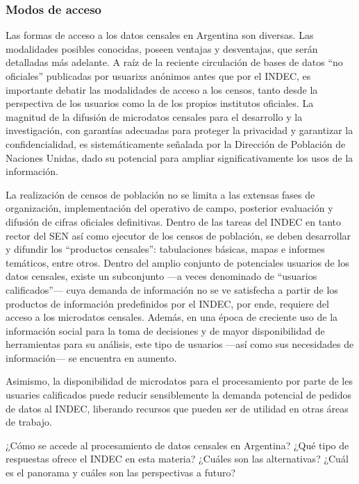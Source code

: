 \documentclass[
]{article}
\begin{document}
\hypertarget{modos-de-acceso}{%
\subsubsection{Modos de acceso}\label{modos-de-acceso}}

Las formas de acceso a los datos censales en Argentina son diversas. Las modalidades posibles conocidas, poseen ventajas y desventajas, que serán detalladas más adelante. A raíz de la reciente circulación de bases de datos ``no oficiales'' publicadas por usuarixs anónimos antes que por el INDEC, es importante debatir las modalidades de acceso a los censos, tanto desde la perspectiva de los usuarios como la de los propios institutos oficiales. La magnitud de la difusión de microdatos censales para el desarrollo y la investigación, con garantías adecuadas para proteger la privacidad y garantizar la confidencialidad, es sistemáticamente señalada por la Dirección de Población de Naciones Unidas, dado su potencial para ampliar significativamente los usos de la información.

La realización de censos de población no se limita a las extensas fases de organización, implementación del operativo de campo, posterior evaluación y difusión de cifras oficiales definitivas. Dentro de las tareas del INDEC en tanto rector del SEN así como ejecutor de los censos de población, se deben desarrollar y difundir los ``productos censales'': tabulaciones básicas, mapas e informes temáticos, entre otros. Dentro del amplio conjunto de potenciales usuarios de los datos censales, existe un subconjunto ---a veces denominado de ``usuarios calificados''--- cuya demanda de información no se ve satisfecha a partir de los productos de información predefinidos por el INDEC, por ende, requiere del acceso a los microdatos censales. Además, en una época de creciente uso de la información social para la toma de decisiones y de mayor disponibilidad de herramientas para su análisis, este tipo de usuarios ---así como sus necesidades de información--- se encuentra en aumento.

Asimismo, la disponibilidad de microdatos para el procesamiento por parte de les usuaries calificados puede reducir sensiblemente la demanda potencial de pedidos de datos al INDEC, liberando recursos que pueden ser de utilidad en otras áreas de trabajo.

¿Cómo se accede al procesamiento de datos censales en Argentina? ¿Qué tipo de respuestas ofrece el INDEC en esta materia? ¿Cuáles son las alternativas? ¿Cuál es el panorama y cuáles son las perspectivas a futuro?
\end{document}
